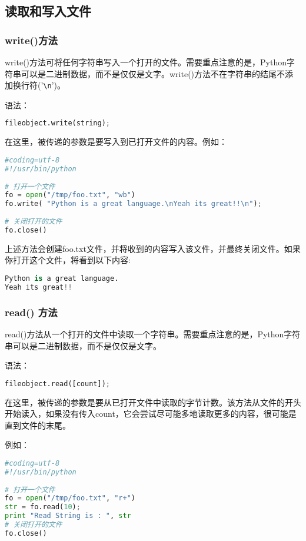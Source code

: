\subsection{读取和写入文件}
\subsubsection{write()方法}
write()方法可将任何字符串写入一个打开的文件。需要重点注意的是，Python字符串可以是二进制数据，而不是仅仅是文字。write()方法不在字符串的结尾不添加换行符('\verb|\n|')。

语法：
 \begin{lstlisting}[language=Python]
fileobject.write(string);
  \end{lstlisting}

在这里，被传递的参数是要写入到已打开文件的内容。例如：
 \begin{lstlisting}[language=Python]
#coding=utf-8
#!/usr/bin/python
 
# 打开一个文件
fo = open("/tmp/foo.txt", "wb")
fo.write( "Python is a great language.\nYeah its great!!\n");
 
# 关闭打开的文件
fo.close()
  \end{lstlisting}
上述方法会创建foo.txt文件，并将收到的内容写入该文件，并最终关闭文件。如果你打开这个文件，将看到以下内容:
 \begin{lstlisting}[language=Python]
Python is a great language.
Yeah its great!!
  \end{lstlisting}



\subsubsection{read() 方法}
read()方法从一个打开的文件中读取一个字符串。需要重点注意的是，Python字符串可以是二进制数据，而不是仅仅是文字。

语法：

 \begin{lstlisting}[language=Python]
fileobject.read([count]);
  \end{lstlisting}
在这里，被传递的参数是要从已打开文件中读取的字节计数。该方法从文件的开头开始读入，如果没有传入count，它会尝试尽可能多地读取更多的内容，很可能是直到文件的末尾。

例如：
 \begin{lstlisting}[language=Python]
#coding=utf-8
#!/usr/bin/python
 
# 打开一个文件
fo = open("/tmp/foo.txt", "r+")
str = fo.read(10);
print "Read String is : ", str
# 关闭打开的文件
fo.close()
  \end{lstlisting}

